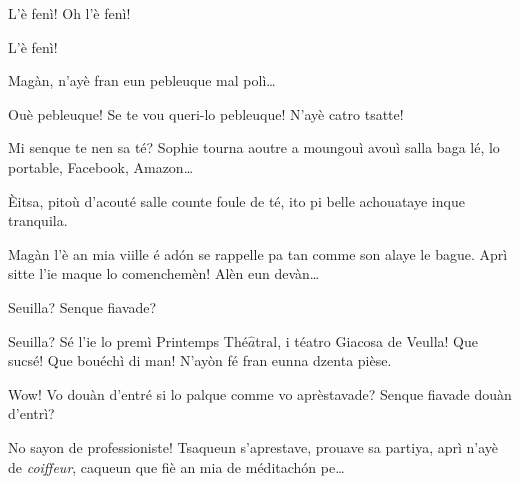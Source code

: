 \begin{drama}

\Mammaspeaks{} L'è fenì!  Oh l'è fenì!


\Spectateurspeaks{} L'è fenì! 





\Nevaousaspeaks Magàn, n'ayè fran eun pebleuque mal polì\ldots

\Maganspeaks Ouè pebleuque! Se te vou queri-lo pebleuque! N'ayè catro tsatte!

\Paganspeaks Mi senque te nen sa té? Sophie tourna aoutre a moungouì avouì salla baga lé, lo portable, Facebook, Amazon\ldots


\Maganspeaks \`Eitsa, pitoù d'acouté salle counte foule de té, ito pi belle achouataye inque tranquila.

\Paganspeaks{} Magàn l'è an mia viille é ad\'on se rappelle pa tan comme son alaye le bague. Aprì sitte l'ie maque lo comenchemèn! Alèn eun devàn\ldots


\Nevaouspeaks{}  Seuilla? Senque fiavade?

\Paganspeaks Seuilla? Sé l'ie lo premì Printemps Thé$\hat{a}$tral, i téatro Giacosa de Veulla! Que sucsé! Que bouéchì di man! N'ayòn fé fran eunna dzenta pièse.

\Nevaousaspeaks Wow! Vo douàn d'entré si lo palque comme vo aprèstavade? Senque fiavade douàn d'entrì?

\Paganspeaks{} No sayon de professioniste! Tsaqueun s'aprestave, prouave sa partiya, aprì n'ayè de \textit{coiffeur}, caqueun que fiè an mia de méditach\'on pe\ldots


\end{drama}

